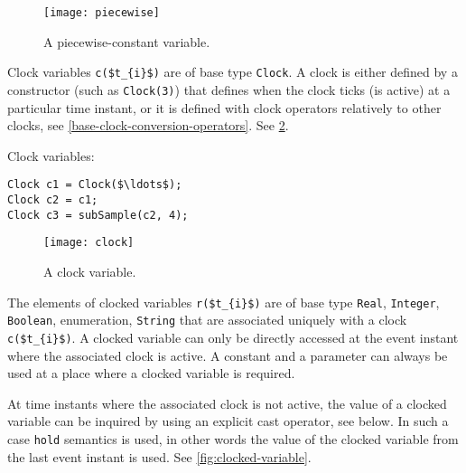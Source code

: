 \begin{figure}[H]
  \begin{center}
    \texttt{[image: piecewise]}
  \end{center}
  \caption{A piecewise-constant variable.}\label{fig:piecewise-constant-variable}
\end{figure}

\begin{definition}
Clock variables \lstinline!c($t_{i}$)! are of base type \lstinline!Clock!.  A clock is either defined by a constructor (such as \lstinline!Clock(3)!) that defines when the clock ticks (is active) at
a particular time instant, or it is defined with clock operators relatively to other clocks, see \cref{base-clock-conversion-operators}.  See \cref{fig:clock-variable}.
\end{definition}

\begin{example}
Clock variables:
\begin{lstlisting}[language=modelica]
Clock c1 = Clock($\ldots$);
Clock c2 = c1;
Clock c3 = subSample(c2, 4);
\end{lstlisting}
\end{example}

\begin{figure}[H]
  \begin{center}
    \texttt{[image: clock]}
  \end{center}
  \caption{A clock variable.}\label{fig:clock-variable}
\end{figure}

\begin{definition}
The elements of clocked variables \lstinline!r($t_{i}$)! are of base type \lstinline!Real!, \lstinline!Integer!, \lstinline!Boolean!, enumeration, \lstinline!String! that are associated uniquely with
a clock \lstinline!c($t_{i}$)!.  A clocked variable can only be directly accessed at the event instant where the associated clock is active.  A constant and a parameter can always be used at a place
where a clocked variable is required.

At time instants where the associated clock is not active, the value of a clocked variable can be inquired by using an explicit cast operator, see below.  In such a case \lstinline!hold! semantics is
used, in other words the value of the clocked variable from the last event instant is used.  See \cref{fig:clocked-variable}.
\end{definition}

